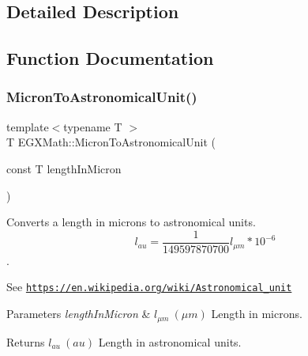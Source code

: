 \subsection{Detailed Description}


\subsection{Function Documentation}
\mbox{\label{group___e_g_x_math-_conversions-_length_conversions-_non-_s_i-_micron-_astronomical_ga2d3ebedddec3a5a3a84405f466a6b6d6}} 
\subsubsection{\texorpdfstring{Micron\+To\+Astronomical\+Unit()}{MicronToAstronomicalUnit()}}
{\footnotesize\ttfamily template$<$typename T $>$ \\
T E\+G\+X\+Math\+::\+Micron\+To\+Astronomical\+Unit (\begin{DoxyParamCaption}\item[{const T}]{length\+In\+Micron }\end{DoxyParamCaption})}



Converts a length in microns to astronomical units. \[ l_{au}= \frac{1}{149597870700} l_{\mu m} * 10^{-6} \]. 

See \href{https://en.wikipedia.org/wiki/Astronomical_unit}{\tt https\+://en.\+wikipedia.\+org/wiki/\+Astronomical\+\_\+unit} 
\begin{DoxyParams}{Parameters}
{\em length\+In\+Micron} & $ l_{\mu m}\ (\mu m)$ Length in microns. \\
\hline
\end{DoxyParams}
\begin{DoxyReturn}{Returns}
$ l_{au}\ (au)$ Length in astronomical units. 
\end{DoxyReturn}
\mbox{\label{group___e_g_x_math-_conversions-_length_conversions-_non-_s_i-_micron-_astronomical_ga34ef31b495ba7e34c7b92f43e0cd41a6}} 
